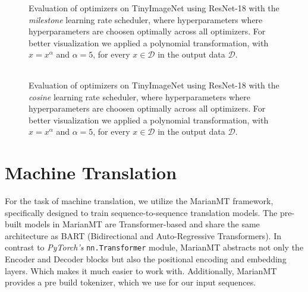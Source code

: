 \begin{figure}[h!]
    \centering
    \begin{tabular}{cc}
         \\ 
    \end{tabular}
    \caption{Evaluation of optimizers on TinyImageNet using ResNet-18 with the \emph{milestone} learning rate scheduler, where hyperparameters
    where hyperparameters are choosen optimally across all optimizers. For better visualization we applied a polynomial transformation, with $\hat{x}=x^\alpha$ and $\alpha=5$, for every $x \in \mathcal{D}$ in the output data $ \mathcal{D}$.}
    \label{fig:tinyimagenet-perf-cosine}
\end{figure}
\begin{figure}[h!]
    \centering
    \begin{tabular}{cc}
         \\ 
    \end{tabular}
    \caption{Evaluation of optimizers on TinyImageNet using ResNet-18 with the \emph{cosine} learning rate scheduler, where hyperparameters
    where hyperparameters are choosen optimally across all optimizers. For better visualization we applied a polynomial transformation, with $\hat{x}=x^\alpha$ and $\alpha=5$, for every $x \in \mathcal{D}$ in the output data $ \mathcal{D}$.}
    \label{fig:tinyimagenet-perf-opt}
\end{figure}

\section{Machine Translation}
For the task of machine translation, we utilize the MarianMT framework, specifically designed to train sequence-to-sequence translation models.
The pre-built models in MarianMT are Transformer-based and share the same architecture
as BART (Bidirectional and Auto-Regressive Transformers). In contrast to \emph{PyTorch's} \texttt{nn.Transformer} module,
MarianMT abstracts not only the Encoder and Decoder blocks but also the positional encoding and embedding layers.
Which makes it much easier to work with. Additionally, MarianMT provides a pre build tokenizer, which we use for our
input sequences.
